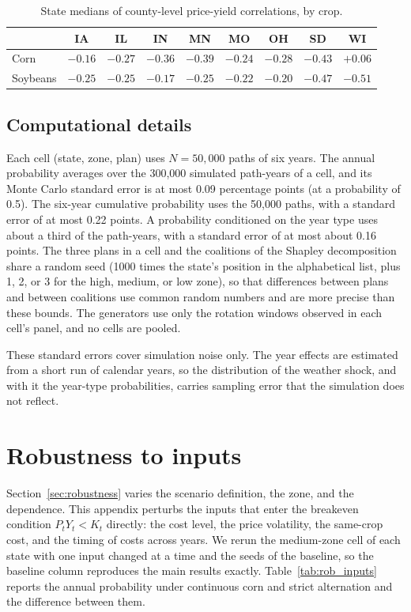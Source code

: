 \documentclass[11pt,letterpaper]{article}
\theoremstyle{remark}
\begin{document}
\begin{table}[H]
\centering
\caption{State medians of county-level price-yield correlations, by crop.}
\label{tab:rho}
\begin{tabular}{lcccccccc}
\toprule
 & IA & IL & IN & MN & MO & OH & SD & WI \\
\midrule
Corn & $-0.16$ & $-0.27$ & $-0.36$ & $-0.39$ & $-0.24$ & $-0.28$ & $-0.43$ & $+0.06$ \\
Soybeans & $-0.25$ & $-0.25$ & $-0.17$ & $-0.25$ & $-0.22$ & $-0.20$ & $-0.47$ & $-0.51$ \\
\bottomrule
\end{tabular}
\end{table}

\subsection{\label{subsec:comp_details}Computational details}

Each cell (state, zone, plan) uses $N = 50{,}000$ paths of six years. The annual probability averages over the 300,000 simulated path-years of a cell, and its Monte Carlo standard error is at most 0.09 percentage points (at a probability of 0.5). The six-year cumulative probability uses the 50,000 paths, with a standard error of at most 0.22 points. A probability conditioned on the year type uses about a third of the path-years, with a standard error of at most about 0.16 points. The three plans in a cell and the coalitions of the Shapley decomposition share a random seed (1000 times the state's position in the alphabetical list, plus 1, 2, or 3 for the high, medium, or low zone), so that differences between plans and between coalitions use common random numbers and are more precise than these bounds. The generators use only the rotation windows observed in each cell's panel, and no cells are pooled.

These standard errors cover simulation noise only. The year effects are estimated from a short run of calendar years, so the distribution of the weather shock, and with it the year-type probabilities, carries sampling error that the simulation does not reflect.

\section{\label{sec:appendix_B}Robustness to inputs}

Section~\ref{sec:robustness} varies the scenario definition, the zone, and the dependence. This appendix perturbs the inputs that enter the breakeven condition $P_tY_t<K_t$ directly: the cost level, the price volatility, the same-crop cost, and the timing of costs across years. We rerun the medium-zone cell of each state with one input changed at a time and the seeds of the baseline, so the baseline column reproduces the main results exactly. Table~\ref{tab:rob_inputs} reports the annual probability under continuous corn and strict alternation and the difference between them.
\end{document}
